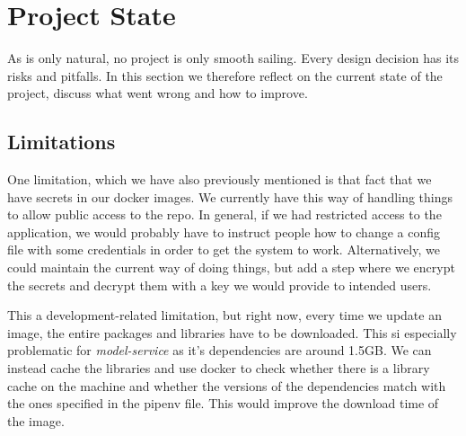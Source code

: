 
\section{Project State}
As is only natural, no project is only smooth sailing. Every design decision has its risks and pitfalls. In this section we therefore reflect on the current state of the project, discuss what went wrong and how to improve.
\subsection{Limitations}
One limitation, which we have also previously mentioned is that fact that we have secrets in our docker images. We currently have this way of handling things to allow public access to the repo. In general, if we had restricted access to the application, we would probably have to instruct people how to change a config file with some credentials in order to get the system to work. Alternatively, we could maintain the current way of doing things, but add a step where we encrypt the secrets and decrypt them with a key we would provide to intended users.

This a development-related limitation, but right now, every time we update an image, the entire packages and libraries have to be downloaded. This si especially problematic for \emph{model-service} as it's dependencies are around 1.5GB. We can instead cache the libraries and use docker to check whether there is a library cache on the machine and whether the versions of the dependencies match with the ones specified in the pipenv file. This would improve the download time of the image.

